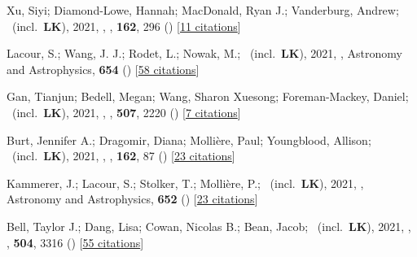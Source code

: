 \item[{\color{numcolor}\scriptsize60}] Xu, Siyi; Diamond-Lowe, Hannah; MacDonald, Ryan J.; Vanderburg, Andrew; \etal\ (incl.\ \textbf{LK}), 2021, , \aj, \textbf{162}, 296 () [\href{https://ui.adsabs.harvard.edu/abs/2021AJ....162..296X}{11 citations}]

\item[{\color{numcolor}\scriptsize59}] Lacour, S.; Wang, J. J.; Rodet, L.; Nowak, M.; \etal\ (incl.\ \textbf{LK}), 2021, , Astronomy and Astrophysics, \textbf{654} () [\href{https://ui.adsabs.harvard.edu/abs/2021A&A...654L...2L}{58 citations}]

\item[{\color{numcolor}\scriptsize58}] Gan, Tianjun; Bedell, Megan; Wang, Sharon Xuesong; Foreman-Mackey, Daniel; \etal\ (incl.\ \textbf{LK}), 2021, , \mnras, \textbf{507}, 2220 () [\href{https://ui.adsabs.harvard.edu/abs/2021MNRAS.507.2220G}{7 citations}]

\item[{\color{numcolor}\scriptsize57}] Burt, Jennifer A.; Dragomir, Diana; Molli{\`e}re, Paul; Youngblood, Allison; \etal\ (incl.\ \textbf{LK}), 2021, , \aj, \textbf{162}, 87 () [\href{https://ui.adsabs.harvard.edu/abs/2021AJ....162...87B}{23 citations}]

\item[{\color{numcolor}\scriptsize56}] Kammerer, J.; Lacour, S.; Stolker, T.; Molli{\`e}re, P.; \etal\ (incl.\ \textbf{LK}), 2021, , Astronomy and Astrophysics, \textbf{652} () [\href{https://ui.adsabs.harvard.edu/abs/2021A&A...652A..57K}{23 citations}]

\item[{\color{numcolor}\scriptsize55}] Bell, Taylor J.; Dang, Lisa; Cowan, Nicolas B.; Bean, Jacob; \etal\ (incl.\ \textbf{LK}), 2021, , \mnras, \textbf{504}, 3316 () [\href{https://ui.adsabs.harvard.edu/abs/2021MNRAS.504.3316B}{55 citations}]

